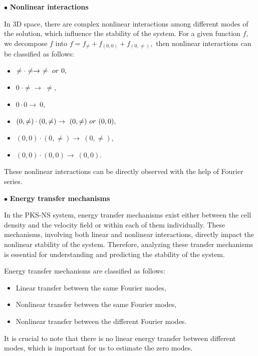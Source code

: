 \documentclass[12pt, reqno]{amsart}
\numberwithin{equation}{section}
\begin{document}
	\noindent$\bullet$ \textbf{Nonlinear interactions}
	
	In 3D space, there are complex nonlinear interactions among different modes of the solution, which influence the stability of the system.
	For a given function $f$, we decompose $f$ into $f=f_{\neq}+f_{(0,0)}+f_{(0,\neq)},$ then  nonlinear interactions can be classified as follows:
	\begin{itemize}
		\item $\neq \cdot \neq \rightarrow ~\neq~{\rm or}~0,$
		\item $0~\cdot \neq \rightarrow ~\neq,$
		\item $ 0\cdot 0\rightarrow~0, $
		\item $(0,\neq) \cdot (0,\neq) \rightarrow ~(0,\neq)~{\rm or}~(0,0),$
		\item $(0,0) \cdot (0,\neq) \rightarrow ~(0,\neq),$
		\item $(0,0) \cdot (0,0) \rightarrow ~(0,0).$
	\end{itemize}
	These nonlinear interactions can be directly observed with the help of Fourier series.
	
	\noindent$\bullet$ \textbf{Energy transfer mechanisms}
	
	In the PKS-NS system, energy transfer mechanisms exist either between the cell density and the velocity field or within each of them individually. These mechanisms, involving both linear and nonlinear interactions, directly impact the nonlinear stability of the system.
	Therefore, analyzing these transfer mechanisms is essential for understanding and predicting the stability of the system. 
	
	Energy transfer mechanisms are classified as follows:
	\begin{itemize}
		\item Linear transfer between the same Fourier modes,
		\item Nonlinear transfer between the same Fourier modes,
		\item Nonlinear transfer between the different Fourier modes.
	\end{itemize}
	It is crucial to note that there is no linear energy transfer between different modes, which is important for us to estimate the zero modes. 
	
	
\end{document}
